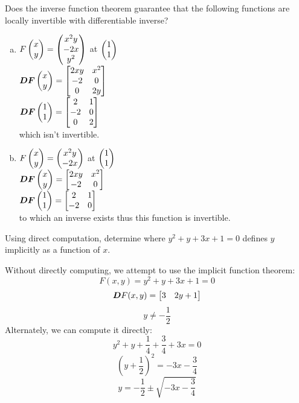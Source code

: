 Does the inverse function theorem guarantee that the following functions are locally invertible with differentiable inverse?

\begin{enumerate}[a.]
  \item $F\begin{pmatrix} x \\ y \end{pmatrix}=\begin{pmatrix} x^2y \\ -2x \\ y^2 \end{pmatrix}$ at $\begin{pmatrix} 1 \\ 1 \end{pmatrix}$ \\
  $\bm{DF}\begin{pmatrix} x \\ y \end{pmatrix} = \begin{bmatrix} 2xy & x^2 \\ -2 & 0 \\ 0 & 2y \end{bmatrix}$ \\
  $\bm{DF}\begin{pmatrix} 1 \\ 1 \end{pmatrix} = \begin{bmatrix} 2 & 1 \\ -2 & 0 \\ 0 & 2 \end{bmatrix}$ \\
  which isn't invertible.
  \item $F\begin{pmatrix} x \\ y \end{pmatrix} = \begin{pmatrix} x^2y \\ -2x \end{pmatrix}$ at $\begin{pmatrix} 1 \\ 1 \end{pmatrix}$ \\
  $\bm{DF}\begin{pmatrix} x \\ y \end{pmatrix} = \begin{bmatrix} 2xy & x^2 \\ -2 & 0 \end{bmatrix}$ \\
  $\bm{DF}\begin{pmatrix} 1 \\ 1 \end{pmatrix} = \begin{bmatrix} 2 & 1 \\ -2 & 0 \end{bmatrix}$ \\
  to which an inverse exists thus this function is invertible.
\end{enumerate}

Using direct computation, determine where $y^2 + y +3x + 1 = 0$ defines $y$ implicitly as a function of $x$.

Without directly computing, we attempt to use the implicit function theorem:
\[F(x, y) = y^2 + y +3x + 1 = 0\]
\[\bm{D}F(x, y) = \begin{bmatrix} 3 & 2y+1 \end{bmatrix}\]
\[y\neq -\frac{1}{2}\]
Alternately, we can compute it directly:
\[y^2 + y + \frac{1}{4} + \frac{3}{4} + 3x = 0\]
\[(y+\frac{1}{2})^2=-3x-\frac{3}{4}\]
\[y = -\frac{1}{2}\pm \sqrt{-3x-\frac{3}{4}}\]
